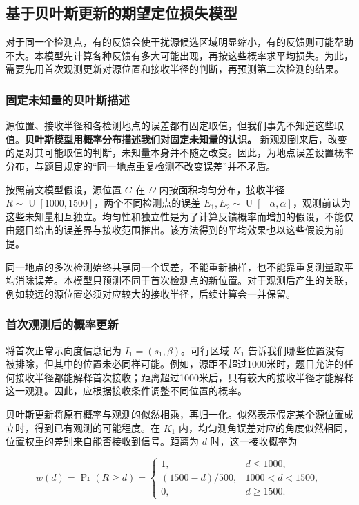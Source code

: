 \subsection{基于贝叶斯更新的期望定位损失模型}

对于同一个检测点，有的反馈会使干扰源候选区域明显缩小，有的反馈则可能帮助不大。本模型先计算各种反馈有多大可能出现，再按这些概率求平均损失。为此，需要先用首次观测更新对源位置和接收半径的判断，再预测第二次检测的结果。

\subsubsection{固定未知量的贝叶斯描述}

源位置、接收半径和各检测地点的误差都有固定取值，但我们事先不知道这些取值。\textbf{贝叶斯模型用概率分布描述我们对固定未知量的认识。} 新观测到来后，改变的是对其可能取值的判断，未知量本身并不随之改变。因此，为地点误差设置概率分布，与题目规定的“同一地点重复检测不改变误差”并不矛盾。

按照前文模型假设，源位置 \(G\) 在 \(\Omega\) 内按面积均匀分布，接收半径 \(R\sim\operatorname{U}[1000,1500]\)，两个不同检测点的误差 \(E_1,E_2\sim\operatorname{U}[-\alpha,\alpha]\)，观测前认为这些未知量相互独立。均匀性和独立性是为了计算反馈概率而增加的假设，不能仅由题目给出的误差界与接收范围推出。该方法得到的平均效果也以这些假设为前提。

同一地点的多次检测始终共享同一个误差，不能重新抽样，也不能靠重复测量取平均消除误差。本模型只预测不同于首次检测点的新位置。对于观测后产生的关联，例如较远的源位置必须对应较大的接收半径，后续计算会一并保留。

\subsubsection{首次观测后的概率更新}

将首次正常示向度信息记为 \(I_1=(s_1,\beta)\)。可行区域 \(K_1\) 告诉我们哪些位置没有被排除，但其中的位置未必同样可能。例如，源距不超过1000米时，题目允许的任何接收半径都能解释首次接收；距离超过1000米后，只有较大的接收半径才能解释这一观测。因此，应根据接收条件调整不同位置的概率。

贝叶斯更新将原有概率与观测的似然相乘，再归一化。似然表示假定某个源位置成立时，得到已有观测的可能程度。在 \(K_1\) 内，均匀测角误差对应的角度似然相同，位置权重的差别来自能否接收到信号。距离为 \(d\) 时，这一接收概率为

\begin{equation}
 w(d)=\Pr(R\ge d)=
 \begin{cases}
 1,&d\le1000,\\
 (1500-d)/500,&1000<d<1500,\\
 0,&d\ge1500.
 \end{cases}
\label{eq:q2-pair-weight}
\end{equation}

